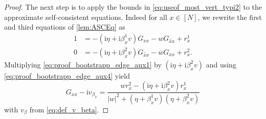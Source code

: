 \documentclass[11pt]{article}
\newcommand{\ii}{\mathrm{i}}
\newcommand{\abs}[1]{\left| #1 \right|}
\theoremstyle{plain}
\theoremstyle{remark}
\numberwithin{equation}{section}
\newcommand*\barr[1]{\overline{#1}}
\newcommand*\ubarr[1]{{\widehat{#1}}}
\begin{document}
\begin{proof}
		The next step is to apply the bounds in \eqref{eq:useof_most_vert_typi2} to the approximate self-consistent equations. Indeed for all $x \in [N]$, we rewrite the first and third equations of \cref{lem:ASCEq} as 
		\begin{align}
			1&= - (\ii \eta + \ii \beta_{x}^1 v) G_{xx} - w G_{\ubarr{x}x} + r_{x}^1 \label{eq:proof_bootstrapp_edge_aux1} \\
			0 &= - (\ii \eta + \ii \beta_{x}^2 v) G_{\ubarr{x}x} - \barr{w} G_{xx} + r_{x}^2. 
			\label{eq:proof_bootstrapp_edge_aux4} 
		\end{align}
		Multiplying \eqref{eq:proof_bootstrapp_edge_aux1} by $(\ii \eta + \ii \beta_{x}^2 v)$ and using \eqref{eq:proof_bootstrapp_edge_aux4} yield 
		\begin{equation}\label{eq:equal_Gxx-vbeta}
			G_{xx} - \ii v_{\beta_x} = \frac{ w r_{x}^2 - (\ii\eta +\ii \beta_x^2 v) r_{x}^1}{\abs{w}^2 + (\eta + \beta_{x}^1 v)(\eta + \beta_{x}^2v)}
		\end{equation}
		with $v_{\beta}$ from \eqref{eq:def_v_beta}. 
		

\end{proof}
\end{document}
